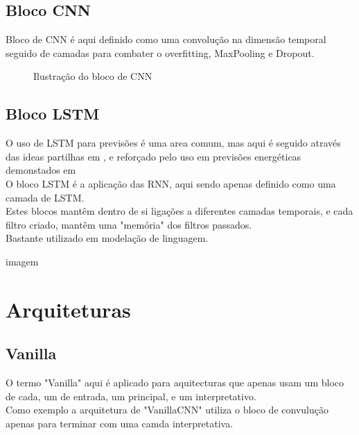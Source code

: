 \subsection{Bloco CNN\label{se:cnn}}

Bloco de CNN é aqui definido como uma convolução na dimensão temporal seguido de camadas para combater o overfitting, MaxPooling e Dropout. \\




\begin{figure}[H]
	\centering
	\resizebox{\linewidth}{!}{}
	\caption{Ilustração do bloco de CNN}
	\label{fig:cnn_block}
\end{figure}



\subsection{Bloco LSTM\label{se:lstm}}

O uso de LSTM para previsões é uma area comum, mas aqui é seguido através das ideas partilhas em \cite{Hewamalage2021}, e reforçado pelo uso em previsões energéticas demonstados em \cite{Costa2022} \\
O bloco LSTM é a aplicação das RNN, aqui sendo apenas definido como uma camada de LSTM. \\
Estes blocos mantêm dentro de si ligações a diferentes camadas temporais, e cada filtro criado, mantêm uma "memória" dos filtros passados. \\
Bastante utilizado em modelação de linguagem.

imagem


\section{Arquiteturas \label{se:arquitecturas}}

\subsection{Vanilla \label{se:vannila}}

O termo "Vanilla" aqui é aplicado para aquitecturas que apenas usam um bloco de cada, um de entrada, um principal, e um interpretativo. \\
Como exemplo a arquitetura de "VanillaCNN" utiliza o bloco de convulução apenas para terminar com uma camda interpretativa.


